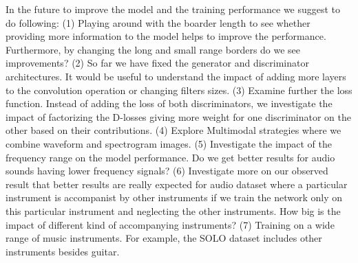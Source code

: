 \documentclass{article} %
\begin{document}
In the future to improve the model and the training performance we suggest to do following: (1) Playing around with the boarder length to see whether providing more information to the model helps to improve the performance. Furthermore, by changing the long and small range borders do we see improvements? (2) So far we have fixed the generator and discriminator architectures. It would be useful to understand the impact of adding more layers to the convolution operation or changing filters sizes. (3) Examine further the loss function. Instead of adding the loss of both discriminators, we investigate the impact of factorizing the D-losses giving more weight for one discriminator on the other based on their contributions. (4) Explore Multimodal strategies where we combine waveform and spectrogram images. (5) Investigate the impact of the frequency range on the model performance. Do we get better results for audio sounds having lower frequency signals? (6) Investigate more on our observed result that better results are really expected for audio dataset where a particular instrument is accompanist by other instruments if we train the network only on this particular instrument and neglecting the other instruments. How big is the impact of different kind of accompanying instruments? (7) Training on a wide range of music instruments. For example, the SOLO dataset includes other instruments besides guitar.



\end{document}

